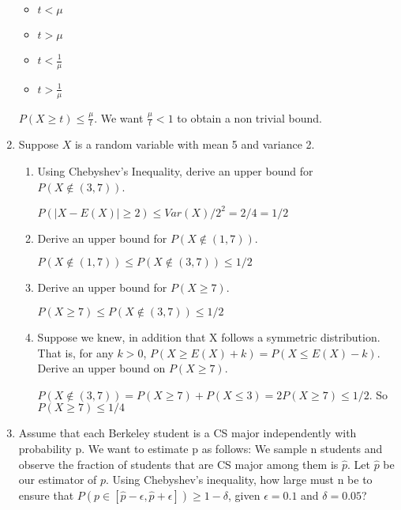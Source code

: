 \documentclass[11pt,preview]{standalone} %
\begin{document}
\begin{enumerate}
\begin{Choices}
\begin{itemize}
	\TrueChoice\item $t < \mu$
	\FalseChoice\item $t > \mu$
	\FalseChoice\item $t < \frac{1}{\mu}$
	\FalseChoice\item $t > \frac{1}{\mu}$

\end{itemize}
\Solution $P(X \geq t ) \leq \frac{\mu}{t}$. We want $\frac{\mu}{t} < 1$ to obtain a non trivial bound. 
\end{Choices}

\item Suppose $X$ is a random variable with mean 5 and variance 2.

\begin{enumerate}
	\item Using Chebyshev's Inequality, derive an upper bound for $P(X \notin (3, 7))$.
	\begin{Freeform}{0.5}
	\Solution $P(|X - E(X)| \geq 2) \leq Var(X) / 2^2 = 2 / 4 = 1/2$

	\end{Freeform}

	\item Derive an upper bound for $P(X \notin (1, 7))$. 
	\begin{Freeform}{0.5}
	\Solution $P(X \notin (1, 7)) \leq P(X \notin (3, 7)) \leq 1/2$
	\end{Freeform}

	\item Derive an upper bound for $P(X \geq 7)$.
	\begin{Freeform}{0.5}
	\Solution $P(X \geq 7) \leq P(X \notin (3, 7)) \leq 1/2$
	\end{Freeform}


	\item Suppose we knew, in addition that X follows a symmetric distribution. That is, for any $k > 0$, $P(X \geq  E(X) + k) = P(X \leq  E(X) - k)$. Derive an upper bound on $P(X \geq 7)$.

	\begin{Freeform}{0.25}
	\Solution $P(X \notin (3, 7)) = P(X \geq 7) + P(X \leq 3) = 2P(X \geq 7) \leq 1/2$. So $P(X \geq 7) \leq 1/4$
	\end{Freeform}



\end{enumerate}
\item Assume that each Berkeley student is a CS major independently with probability p. We want to estimate p as follows: We sample n students and observe the fraction of students that are CS major among them is $\hat{p}$. Let $\hat{p}$ be our estimator of $p$. Using Chebyshev's inequality, how large must n be to ensure that $P(p \in [\hat{p} - \epsilon, \hat{p} + \epsilon]) \geq 1 - \delta$, given $\epsilon = 0.1$ and $\delta = 0.05$? 


\end{enumerate}
\end{document}
